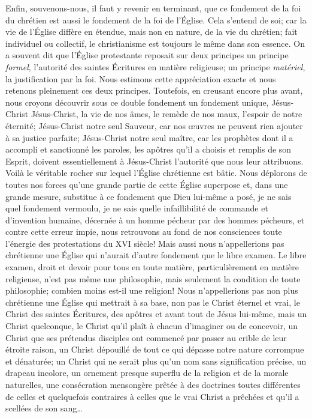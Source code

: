 Enfin, souvenons-nous, il faut y revenir en terminant, que ce fondement de la foi du chrétien est aussi le fondement
de la foi de l’Église. Cela s’entend de soi; car la vie de l’Église diffère en étendue, mais non en nature, de la vie du chrétien;
fait individuel ou collectif, le christianisme est toujours le même dans son essence.
On a souvent dit que l’Église protestante reposait sur deux principes\frcolon{}
un principe \emph{formel}, l’autorité des saintes Écritures en matière religieuse;
un principe \emph{matériel}, la justification par la foi.
Nous estimons cette appréciation exacte et nous retenons pleinement ces deux principes.
Toutefois, en creusant encore plus avant, nous croyons découvrir sous ce double fondement un fondement unique, Jésus-Christ\frcolon{}
Jésus-Christ, la vie de nos âmes, le remède de nos maux, l’espoir de notre éternité;
Jésus-Christ notre seul Sauveur, car nos œuvres ne peuvent rien ajouter à sa justice parfaite;
Jésus-Christ notre seul maître, car les prophètes dont il a accompli et sanctionné les paroles,
les apôtres qu’il a choisis et remplis de son Esprit, doivent essentiellement à Jésus-Christ
l’autorité que nous leur attribuons. Voilà le véritable rocher sur lequel l’Église chrétienne est bâtie.
Nous déplorons de toutes nos forces qu’une grande partie de cette Église superpose et,
dans une grande mesure, substitue à ce fondement que Dieu lui-même a posé,
je ne sais quel fondement vermoulu, je ne sais quelle infaillibilité de commande et d’invention humaine,
décernée à un homme pécheur par des hommes pécheurs,
et contre cette erreur impie, nous retrouvons au fond de nos consciences toute l’énergie des protestations
du XVI siècle! \ocadr{} Mais aussi nous n’appellerions pas chrétienne une Église qui n’aurait
d’autre fondement que le libre examen.
Le libre examen, droit et devoir pour tous en toute matière, particulièrement en matière religieuse,
n’est pas même une philosophie, mais seulement la condition de toute philosophie;
combien moins est-il une religion!
Nous n’appellerions pas non plus chrétienne une Église qui mettrait à sa base, non pas le Christ éternel et vrai,
le Christ des saintes Écritures, des apôtres et avant tout de Jésus lui-même, mais un Christ quelconque,
le Christ qu’il plaît à chacun d’imaginer ou de concevoir, un Christ que ses prétendus disciples ont commencé
par passer au crible de leur étroite raison, un Christ dépouillé de tout ce qui dépasse notre nature corrompue et dénaturée;
un Christ qui ne serait plus qu’un nom sans signification précise, un drapeau incolore, un ornement presque superflu
de la religion et de la morale naturelles, une consécration mensongère prêtée à des doctrines toutes différentes
de celles \ocadr{} et quelquefois contraires à celles \fcadr{} que le vrai Christ a prêchées et qu’il a scellées de son sang…

